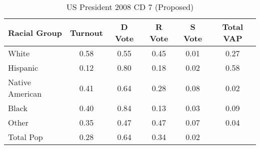 \begin{table}[htb]
\begin{center}
\caption{US President 2008 CD 7 (Proposed)}
\label{pres08_vap_cd_7}
\begin{tabular}{lccccc}
  \hline
Racial Group & Turnout & D Vote & R Vote & S Vote & Total VAP \\ 
  \hline
White & 0.58 & 0.55 & 0.45 & 0.01 & 0.27 \\ 
  Hispanic & 0.12 & 0.80 & 0.18 & 0.02 & 0.58 \\ 
  Native American & 0.41 & 0.64 & 0.28 & 0.08 & 0.02 \\ 
  Black & 0.40 & 0.84 & 0.13 & 0.03 & 0.09 \\ 
  Other & 0.35 & 0.47 & 0.47 & 0.07 & 0.04 \\ 
  Total Pop & 0.28 & 0.64 & 0.34 & 0.02 &  \\ 
   \hline
\end{tabular}
\end{center}
\end{table}
